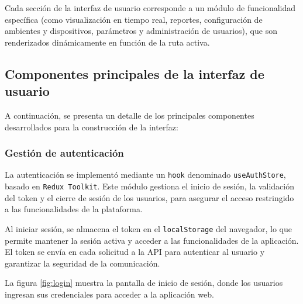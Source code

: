 Cada sección de la interfaz de usuario corresponde a un módulo de funcionalidad
específica (como visualización en tiempo real, reportes, configuración de
ambientes y dispositivos, parámetros y administración de usuarios), que son
renderizados dinámicamente en función de la ruta activa.



\subsection{Componentes principales de la interfaz de usuario}

A continuación, se presenta un detalle de los principales componentes
desarrollados para la construcción de la interfaz:

\subsubsection{Gestión de autenticación}

La autenticación se implementó mediante un \texttt{hook} denominado
\texttt{useAuthStore}, basado en \texttt{Redux Toolkit}. Este módulo gestiona
el inicio de sesión, la validación del token y el cierre de sesión de los
usuarios, para asegurar el acceso restringido a las funcionalidades de la
plataforma.

Al iniciar sesión, se almacena el token en el \texttt{localStorage} del
navegador, lo que permite mantener la sesión activa y acceder a las
funcionalidades de la aplicación. El token se envía en cada solicitud a la API
para autenticar al usuario y garantizar la seguridad de la comunicación.

La figura \ref{fig:login} muestra la pantalla de inicio de sesión, donde los
usuarios ingresan sus credenciales para acceder a la aplicación web.

